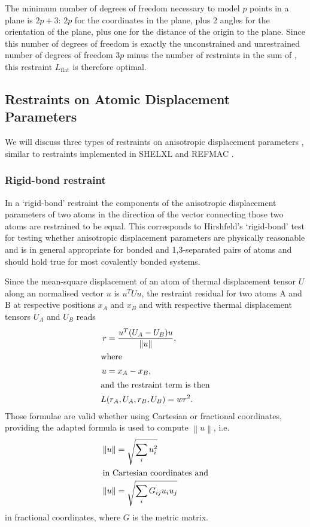 \documentclass[pdf]{iucr}
\newcommand{\norm}[1]{\left\| #1 \right\|}
\begin{document}
The minimum number of degrees of freedom necessary to model $p$ points in a plane is $2p+3$: $2p$ for the coordinates in the plane, plus 2 angles for the orientation of the plane, plus one for the distance of the origin to the plane. Since this number of degrees of freedom is exactly the unconstrained and unrestrained number of degrees of freedom $3p$ minus the number of restraints in the sum of , this restraint $L_\text{flat}$ is therefore optimal.

\subsection{Restraints on Atomic Displacement Parameters}

We will discuss three types of restraints on anisotropic displacement parameters , similar to restraints implemented in SHELXL and REFMAC .

\subsubsection{Rigid-bond restraint}

In a `rigid-bond' restraint the components of the anisotropic displacement parameters of two atoms in the direction of the vector connecting those two atoms are restrained to be equal. This corresponds to Hirshfeld's `rigid-bond' test  for testing whether anisotropic displacement parameters are physically reasonable  and is in general appropriate for bonded and 1,3-separated pairs of atoms and should hold true for most covalently bonded systems.

Since the mean-square displacement of an atom of thermal displacement tensor $U$ along an normalised vector $u$ is $u^T U u$, the restraint residual for two atoms A and B at respective positions $x_A$ and $x_B$ and with respective thermal displacement tensors $U_A$ and $U_B$ reads
\begin{align}
\label{eqn:rigid_bond}
r &= \frac{u^T (U_A - U_B) u}{\norm{u}},\\
\shortintertext{where}
u &= x_A - x_B, \\
\shortintertext{and the restraint term is then}
L&(r_A, U_A, r_B, U_B) = w r^2.
\end{align}
Those formulae are valid whether using Cartesian or fractional coordinates, providing the adapted formula is used to compute $\norm{u}$, i.e.
\begin{align}
\norm{u} &= \sqrt{\sum_i u_i^2}\\
\shortintertext{in Cartesian coordinates and}
\norm{u} &= \sqrt{\sum_i G_{ij} u_i u_j}
\end{align}
in fractional coordinates, where $G$ is the metric matrix.
\end{document}
